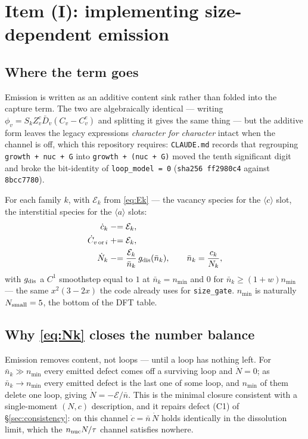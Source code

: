 \documentclass[11pt]{article}
\newcommand{\aloop}{\ensuremath{\langle a\rangle}}
\newcommand{\cloop}{\ensuremath{\langle c\rangle}}
\newcommand{\fbk}{\discretionary{}{}{}}   %
\newcommand{\file}[1]{\texttt{\small #1}}
\begin{document}
\section{Item (I): implementing size-dependent emission}

\subsection{Where the term goes}

Emission is written as an additive content sink rather than folded into the
capture term.  The two are algebraically identical --- writing
$\phi_v = S_k Z_v^{c}\bar D_v (C_v - C_v^{e})$ and splitting it gives the same
thing --- but the additive form leaves the legacy expressions
\emph{character for character} intact when the channel is off, which this
repository requires: \file{CLAUDE.\fbk md} records that regrouping
\verb|growth + nuc + G| into \verb|growth + (nuc + G)| moved the tenth
significant digit and broke the bit-identity of \verb|loop_model = 0|
(\verb|sha256 ff2980c4| against \verb|8bcc7780|).

For each family $k$, with $\mathcal E_k$ from \eqref{eq:Ek} --- the vacancy
species for the \cloop{} slot, the interstitial species for the \aloop{}
slots:
\begin{align}
\dot c_k &\mathrel{-}= \mathcal E_k ,
\label{eq:ck}\\
\dot C_{v\,\text{or}\,i} &\mathrel{+}= \mathcal E_k ,
\label{eq:Cv}\\
\dot N_k &\mathrel{-}= \frac{\mathcal E_k}{\bar n_k}\,g_{\rm dis}(\bar n_k),
  \qquad \bar n_k=\frac{c_k}{N_k},
\label{eq:Nk}
\end{align}
with $g_{\rm dis}$ a $C^{1}$ smoothstep equal to $1$ at $\bar n_k=n_{\min}$
and $0$ for $\bar n_k\geq(1+w)n_{\min}$ --- the same $x^{2}(3-2x)$ the code
already uses for \verb|size_gate|.  $n_{\min}$ is naturally $N_{\rm small}=5$,
the bottom of the DFT table.

\subsection{Why \texorpdfstring{\eqref{eq:Nk}}{the number sink} closes the number balance}

Emission removes content, not loops --- until a loop has nothing left.  For
$\bar n_k \gg n_{\min}$ every emitted defect comes off a surviving loop and
$\dot N=0$; as $\bar n_k\to n_{\min}$ every emitted defect is the last one of
some loop, and $n_{\min}$ of them delete one loop, giving
$\dot N = -\mathcal E/\bar n$.  This is the minimal closure consistent with a
single-moment $(N,c)$ description, and it repairs defect (C1) of
\S\ref{sec:consistency}: on this channel $\dot c = \bar n\,\dot N$ holds
identically in the dissolution limit, which the $n_{\rm nuc}N/\tau$ channel
satisfies nowhere.
\end{document}
